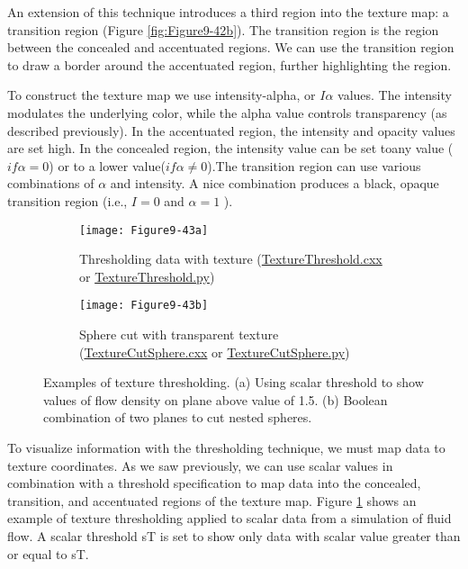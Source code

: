 An extension of this technique introduces a third region into the texture map: a transition region (Figure \ref{fig:Figure9-42b}). The transition region is the region between the concealed and accentuated regions. We can use the transition region to draw a border around the accentuated region, further highlighting the region.

To construct the texture map we use intensity-alpha, or $I\alpha$ values. The intensity modulates the underlying color, while the alpha value controls transparency (as described previously). In the accentuated region, the intensity and opacity values are set high. In the concealed region, the intensity value can be set toany value ($if \alpha = 0$) or to a lower value($if \alpha \ne 0$).The transition region can use various combinations of $\alpha$ and intensity. A nice combination produces a black, opaque transition region (i.e., $I = 0$ and $\alpha = 1$ ).

\begin{figure}[htb]
	\begin{subfigure}[h]{0.48\linewidth}
		\texttt{[image: Figure9-43a]}
		\captionsetup{justification=centering}
		\caption{Thresholding data with texture (\href{https://lorensen.github.io/VTKExamples/site/Cxx/Texture/TextureThreshold/}{TextureThreshold.cxx} or \href{https://lorensen.github.io/VTKExamples/site/Python/Texture/TextureThreshold/}{TextureThreshold.py})}
		\label{fig:Figure9-43a}
	\end{subfigure}
	\hfill
	\begin{subfigure}[h]{0.48\linewidth}
		\texttt{[image: Figure9-43b]}
		\captionsetup{justification=centering}
		\caption{Sphere cut with transparent texture (\href{https://lorensen.github.io/VTKExamples/site/Cxx/Texture/TextureCutSphere/}{TextureCutSphere.cxx} or \href{https://lorensen.github.io/VTKExamples/site/Python/Texture/TextureCutSphere/}{TextureCutSphere.py})}
		\label{fig:Figure9-43b}
	\end{subfigure}
	\caption{Examples of texture thresholding. (a) Using scalar threshold to show values of flow density on plane above value of 1.5. (b) Boolean combination of two planes to cut nested spheres.}\label{fig:Figure9-43}
\end{figure}

To visualize information with the thresholding technique, we must map data to texture coordinates. As we saw previously, we can use scalar values in combination with a threshold specification to map data into the concealed, transition, and accentuated regions of the texture map. Figure \ref{fig:Figure9-43a} shows an example of texture thresholding applied to scalar data from a simulation of fluid flow. A scalar threshold sT is set to show only data with scalar value greater than or equal to sT.

